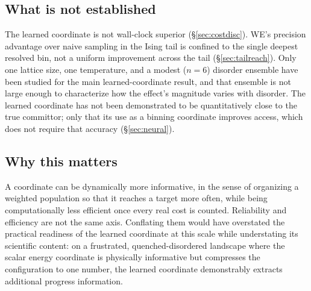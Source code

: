 \documentclass[a4paper,fleqn]{cas-sc}
\begin{document}
\subsection{What is not established}\label{sec:notestablished}
The learned coordinate is not wall-clock superior (\S\ref{sec:costdisc}). WE's precision
advantage over naive sampling in the Ising tail is confined to the single deepest resolved bin,
not a uniform improvement across the tail (\S\ref{sec:tailreach}). Only one lattice size, one temperature, and a modest ($n=6$) disorder
ensemble have been studied for the main learned-coordinate result, and that ensemble is not
large enough to characterize how the effect's magnitude varies with disorder. The learned
coordinate has not been demonstrated to be quantitatively close to the true committor; only
that its use as a binning coordinate improves access, which does not require that accuracy
(\S\ref{sec:neural}).

\subsection{Why this matters}\label{sec:whymatters}
A coordinate can be dynamically more informative, in the sense of organizing a weighted
population so that it reaches a target more often, while being computationally less efficient
once every real cost is counted. Reliability and efficiency are not the same axis. Conflating
them would have overstated the practical readiness of the learned coordinate at this scale
while understating its scientific content: on a frustrated, quenched-disordered landscape
where the scalar energy coordinate is physically informative but compresses the configuration
to one number, the learned coordinate demonstrably extracts additional progress information.
\end{document}
